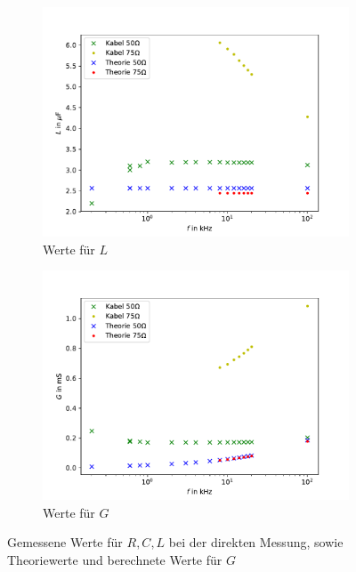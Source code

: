 \begin{figure}[h]
\begin{subfigure}{0.496\textwidth}
		\includegraphics[width=\textwidth]{RLC_DirekteMessung/build/PlotL.pdf}
		\caption{Werte für $L$}
		\label{fig:PlotL}
	\end{subfigure}
	\begin{subfigure}{0.496\textwidth}
		\centering
		\includegraphics[width=\textwidth]{RLC_DirekteMessung/build/PlotG.pdf}
		\caption{Werte für $G$}
		\label{fig:PlotG}
	\end{subfigure}
	\caption[Werte bei der direkten Messung]{Gemessene Werte für $R,C,L$ bei der direkten Messung, sowie Theoriewerte und berechnete Werte für $G$}
	\label{fig:PlotRLCG}
\end{figure}